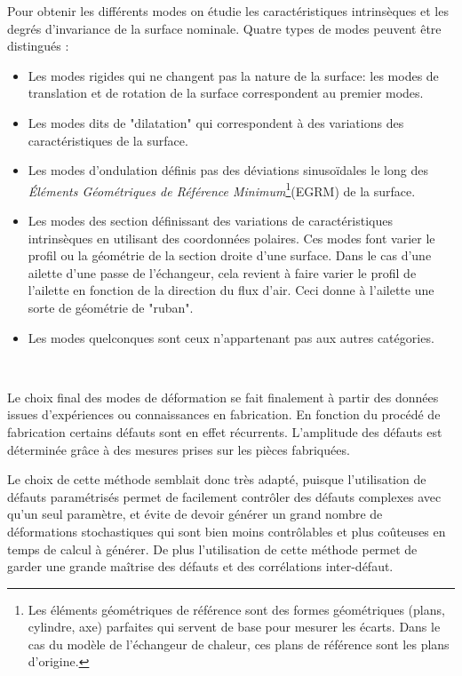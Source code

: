 \documentclass[a4paper,10pt]{article}
\begin{document}
Pour obtenir les différents modes on étudie les caractéristiques intrinsèques et les degrés d'invariance de la surface nominale. Quatre types de modes peuvent être distingués : 
\begin{itemize}
	\item Les modes rigides qui ne changent pas la nature de la surface: les modes de translation et de rotation de la surface correspondent au premier modes. 
	\item Les modes dits de "dilatation" qui correspondent à des variations des caractéristiques de la surface. 
	\item Les modes d'ondulation définis pas des déviations sinusoïdales le long des \textit{Éléments Géométriques de Référence Minimum}\footnote{Les éléments géométriques de référence sont des formes géométriques (plans, cylindre, axe) parfaites qui servent de base pour mesurer les écarts. Dans le cas du modèle de l'échangeur de chaleur, ces plans de référence sont les plans d'origine.}(EGRM) de la surface.  
	\item Les modes des section définissant des variations de caractéristiques intrinsèques en utilisant des coordonnées polaires. Ces modes font varier le profil ou la géométrie de la section droite d'une surface. Dans le cas d'une ailette d'une passe de l'échangeur, cela revient à faire varier le profil de l'ailette en fonction de la direction du flux d'air. Ceci donne à l'ailette une sorte de géométrie de "ruban". 
	\item Les modes quelconques sont ceux n'appartenant pas aux autres catégories. 
\end{itemize} \

Le choix final des modes de déformation se fait finalement à partir des données issues d’expériences ou connaissances en fabrication. En fonction du procédé de fabrication certains défauts sont en effet récurrents. L'amplitude des défauts est déterminée grâce à des mesures prises sur les pièces fabriquées. 
\linebreak

Le choix de cette méthode semblait donc très adapté, puisque l'utilisation de défauts paramétrisés permet de facilement contrôler des défauts complexes avec qu'un seul paramètre, et évite de devoir générer un grand nombre de déformations stochastiques qui sont bien moins contrôlables et plus coûteuses en temps de calcul à générer. 
De plus l'utilisation de cette méthode permet de garder une grande maîtrise des défauts et des corrélations inter-défaut.
\linebreak
\end{document}
